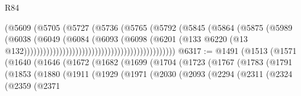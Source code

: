 \begin{lexlean}{R84}
\begin{coremodule}
                                                              (@5609
                                                                (@5705
                                                                  (@5727
                                                                    (@5736
                                                                      (@5765
                                                                        (@5792
                                                                          (@5845
                                                                            (@5864
                                                                              (@5875
                                                                                (@5989
                                                                                  (@6038
                                                                                    (@6049
                                                                                      (@6084
                                                                                        (@6093
                                                                                          (@6098
                                                                                            (@6201
                                                                                              (@133
                                                                                                @6220
                                                                                                (@13
                                                                                                  @132)))))))))))))))))))))))))))))))))))))))))))))))
@6317 := @1491
    (@1513
      (@1571
        (@1640
          (@1646
            (@1672
              (@1682
                (@1699
                  (@1704
                    (@1723
                      (@1767
                        (@1783
                          (@1791
                            (@1853
                              (@1880
                                (@1911
                                  (@1929
                                    (@1971
                                      (@2030
                                        (@2093
                                          (@2294
                                            (@2311
                                              (@2324
                                                (@2359
                                                  (@2371

\end{coremodule}
\end{lexlean}
